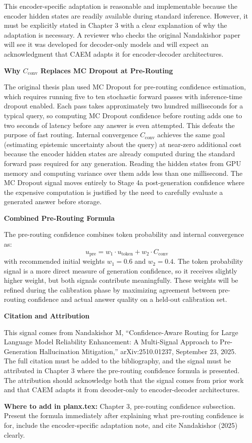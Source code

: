 \documentclass[11pt,a4paper]{article}
\newcommand{\Cconv}{C_{\text{conv}}}
\newcommand{\upre}{u_{\text{pre}}}
\begin{document}
{This encoder-specific adaptation is reasonable and implementable because the encoder hidden states are readily available during standard inference. However, it must be explicitly stated in Chapter 3 with a clear explanation of why the adaptation is necessary. A reviewer who checks the original Nandakishor paper will see it was developed for decoder-only models and will expect an acknowledgment that CAEM adapts it for encoder-decoder architectures.

\textbf{Why $\Cconv$ Replaces MC Dropout at Pre-Routing}

The original thesis plan used MC Dropout for pre-routing confidence estimation, which requires running five to ten stochastic forward passes with inference-time dropout enabled. Each pass takes approximately two hundred milliseconds for a typical query, so computing MC Dropout confidence before routing adds one to two seconds of latency before any answer is even attempted. This defeats the purpose of fast routing. Internal convergence $\Cconv$ achieves the same goal (estimating epistemic uncertainty about the query) at near-zero additional cost because the encoder hidden states are already computed during the standard forward pass required for any generation. Reading the hidden states from GPU memory and computing variance over them adds less than one millisecond. The MC Dropout signal moves entirely to Stage 4a post-generation confidence where the expensive computation is justified by the need to carefully evaluate a generated answer before storage.

\textbf{Combined Pre-Routing Formula}

The pre-routing confidence combines token probability and internal convergence as:
\[
\upre = w_1 \cdot u_{\text{token}} + w_2 \cdot \Cconv
\]
with recommended initial weights $w_1 = 0.6$ and $w_2 = 0.4$. The token probability signal is a more direct measure of generation confidence, so it receives slightly higher weight, but both signals contribute meaningfully. These weights will be refined during the calibration phase by maximizing agreement between pre-routing confidence and actual answer quality on a held-out calibration set.

\textbf{Citation and Attribution}

This signal comes from Nandakishor M, ``Confidence-Aware Routing for Large Language Model Reliability Enhancement: A Multi-Signal Approach to Pre-Generation Hallucination Mitigation,'' arXiv:2510.01237, September 23, 2025. The full citation must be added to the bibliography, and the signal must be attributed in Chapter 3 where the pre-routing confidence formula is presented. The attribution should acknowledge both that the signal comes from prior work and that CAEM adapts it from decoder-only to encoder-decoder architectures.

\textbf{Where to add in planx.tex:} Chapter 3, pre-routing confidence subsection. Present the formula immediately after explaining what pre-routing confidence is for, include the encoder-specific adaptation note, and cite Nandakishor (2025) clearly.
}
\end{document}
